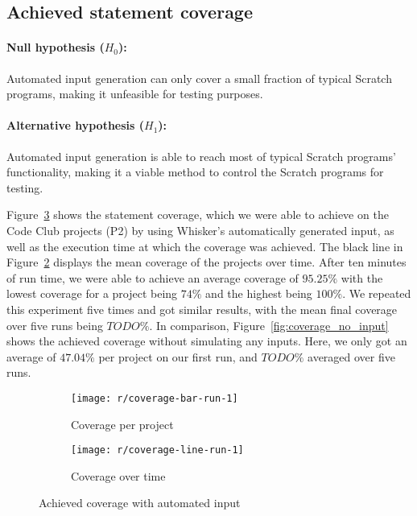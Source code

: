 \subsection{Achieved statement coverage}


\paragraph{Null hypothesis ($H_0$):}
Automated input generation can only cover a small fraction of typical Scratch programs, making it unfeasible for testing purposes.
\paragraph{Alternative hypothesis ($H_1$):}
Automated input generation is able to reach most of typical Scratch programs' functionality, making it a viable method to control the Scratch programs for testing.
\parspace

\noindent Figure~\ref{fig:coverage} shows the statement coverage, which we were able to achieve on the Code Club projects (P2) by using Whisker's automatically generated input,
as well as the execution time at which the coverage was achieved.
The black line in Figure~\ref{fig:coverage_line} displays the mean coverage of the projects over time.
After ten minutes of run time, we were able to achieve an average coverage of $95.25\%$ with the lowest coverage for a project being $74\%$ and the highest being $100\%$.
We repeated this experiment five times and got similar results, with the mean final coverage over five runs being $TODO\%$.
In comparison, Figure~\ref{fig:coverage_no_input} shows the achieved coverage without simulating any inputs.
Here, we only got an average of $47.04\%$ per project on our first run, and $TODO\%$ averaged over five runs.
\parspace

\begin{figure}[htpb]
    \centering
    \begin{subfigure}{\textwidth}
        \texttt{[image: r/coverage-bar-run-1]}
        \caption{Coverage per project}
        \label{fig:coverage_bar}
    \end{subfigure}

    \bigskip

    \begin{subfigure}{\textwidth}
        \texttt{[image: r/coverage-line-run-1]}
        \caption{Coverage over time}
        \label{fig:coverage_line}
    \end{subfigure}

    \caption{Achieved coverage with automated input}
    \label{fig:coverage}
\end{figure}

